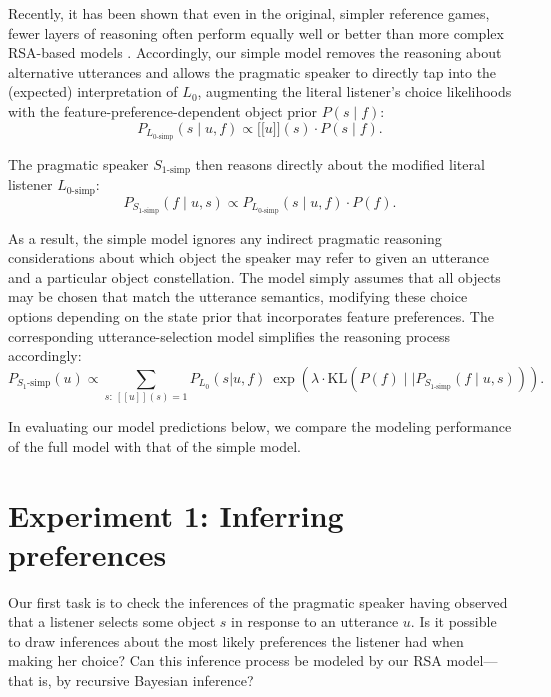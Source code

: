 \documentclass[11pt,a4paper]{article}
\newcommand{\sem}[1]{\mbox{$[\![$#1$]\!]$}}
\begin{document}
Recently, it has been shown that even in the original, simpler reference games, fewer layers of reasoning often perform equally well or better than more complex RSA-based models \cite{sikos2019}.
Accordingly, our simple model removes the reasoning about alternative utterances and allows the pragmatic speaker to directly tap into the (expected) interpretation of $L_0$, augmenting the literal listener's choice likelihoods with the feature-preference-dependent object prior $P(s\mid f)$:
\begin{equation}
P_{L_{0\textrm{-simp}}}(s\mid u,f) \propto \sem{$u$}(s) \cdot P(s\mid f).
\end{equation}

The pragmatic speaker $S_{1\textrm{-simp}}$ then reasons directly about the modified literal listener $L_{0\textrm{-simp}}$: 
\begin{equation}
P_{S_{1\textrm{-simp}}}(f\mid u,s) \propto P_{L_{0\textrm{-simp}}}(s\mid u,f) \cdot P(f).
\end{equation}

As a result, the simple model ignores any indirect pragmatic reasoning considerations about which object the speaker may refer to given an utterance and a particular object constellation.
The model simply assumes that all objects may be chosen that match the utterance semantics, modifying these choice options depending on the state prior that incorporates feature preferences. The corresponding utterance-selection model simplifies the reasoning process accordingly:
\begin{equation}
P_{S_1\textrm{-simp}}(u) \propto \sum_{s:\  [\![u]\!](s)=1} P_{L_0}(s|u,f)\ \exp(\lambda \cdot \textrm{KL}(P(f)\mid\mid P_{S_{1\textrm{-simp}}}(f\mid u,s))).
\label{eq:kldivlambdasimp}
\end{equation}

In evaluating our model predictions below, we compare the modeling performance of the full model with that of the simple model.


\section{Experiment 1: Inferring preferences} \label{experiment1}

Our first task is to check the inferences of the pragmatic speaker having observed that a listener selects some object $s$ in response to an utterance $u$. 
Is it possible to draw inferences about the most likely preferences the listener had when making her choice? 
Can this inference process be modeled by our RSA model---that is, by recursive Bayesian inference?
\end{document}

